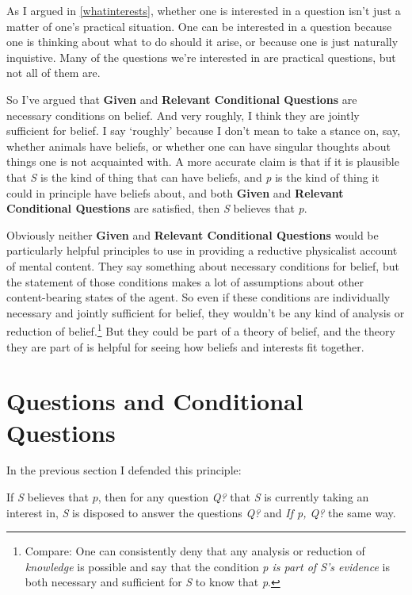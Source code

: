 \documentclass[11pt,]{book}
\providecommand{\tightlist}{%
  \setlength{\itemsep}{0pt}\setlength{\parskip}{0pt}}
\let\rmarkdownfootnote\footnote%
\def\footnote{\protect\rmarkdownfootnote}
\begin{document}
As I argued in \ref{whatinterests}, whether one is interested in a question isn't just a matter of one's practical situation. One can be interested in a question because one is thinking about what to do should it arise, or because one is just naturally inquistive. Many of the questions we're interested in are practical questions, but not all of them are.

So I've argued that \textbf{Given} and \textbf{Relevant Conditional Questions} are necessary conditions on belief. And very roughly, I think they are jointly sufficient for belief. I say `roughly' because I don't mean to take a stance on, say, whether animals have beliefs, or whether one can have singular thoughts about things one is not acquainted with. A more accurate claim is that if it is plausible that \emph{S} is the kind of thing that can have beliefs, and \emph{p} is the kind of thing it could in principle have beliefs about, and both \textbf{Given} and \textbf{Relevant Conditional Questions} are satisfied, then \emph{S} believes that \emph{p}.

Obviously neither \textbf{Given} and \textbf{Relevant Conditional Questions} would be particularly helpful principles to use in providing a reductive physicalist account of mental content. They say something about necessary conditions for belief, but the statement of those conditions makes a lot of assumptions about other content-bearing states of the agent. So even if these conditions are individually necessary and jointly sufficient for belief, they wouldn't be any kind of analysis or reduction of belief.\footnote{Compare: One can consistently deny that any analysis or reduction of \emph{knowledge} is possible and say that the condition \emph{p is part of S's evidence} is both necessary and sufficient for \emph{S} to know that \emph{p}.} But they could be part of a theory of belief, and the theory they are part of is helpful for seeing how beliefs and interests fit together.

\hypertarget{questions}{%
\section{Questions and Conditional Questions}\label{questions}}

In the previous section I defended this principle:

\begin{description}
\tightlist
\item[Relevant Conditional Questions]
If \emph{S} believes that \(p\), then for any question \emph{Q?} that \emph{S} is currently taking an interest in, \emph{S} is disposed to answer the questions \emph{Q?} and \emph{If p, Q?} the same way.
\end{description}
\end{document}
